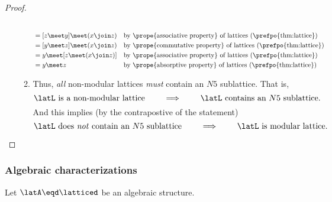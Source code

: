 \begin{proof}
\begin{enumerate}
\begin{enumerate}
\begin{align*}
          \\&= [z\meet y]\meet(x\join z)
            && \text{by \prope{associative property} of lattices (\prefpo{thm:lattice})}
          \\&= [y\meet z]\meet(x\join z)
            && \text{by \prope{commutative property} of lattices (\prefpo{thm:lattice})}
          \\&= y\meet [z\meet(x\join z)]
            && \text{by \prope{associative property} of lattices (\prefpo{thm:lattice})}
          \\&= y\meet z
            && \text{by \prope{absorptive property} of lattices (\prefpo{thm:lattice})}
        \end{align*}

      \item Thus, \emph{all} non-modular lattices \emph{must} contain an $N5$ sublattice.
            That is,
            \[ \text{$\latL$ is a non-modular lattice} \qquad\implies\qquad \text{$\latL$ contains an $N5$ sublattice}.\]
            And this implies (by the contrapostive of the statement)
            \[ \text{$\latL$ does \emph{not} contain an $N5$ sublattice} \qquad\implies\qquad \text{$\latL$ is modular lattice}.\]
    \end{enumerate}

\end{enumerate}
\end{proof}


\subsubsection{Algebraic characterizations}
\begin{theorem}
\label{thm:lat_char_r1957}
Let $\latA\eqd\latticed$ be an algebraic structure.
\end{theorem}





